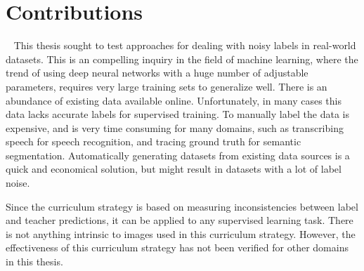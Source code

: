 \section{Contributions}~\label{cont}
\label{sec:Contributions}
This thesis sought to test approaches for dealing with noisy labels in real-world datasets. This is an compelling inquiry in the field of machine learning, where the trend of using deep neural networks with a huge number of adjustable parameters, requires very large training sets to generalize well. There is an abundance of existing data available online. Unfortunately, in many cases this data lacks accurate labels for supervised training. To manually label the data is expensive, and is very time consuming for many domains, such as transcribing speech for speech recognition, and tracing ground truth for semantic segmentation. Automatically generating datasets from existing data sources is a quick and economical solution, but might result in datasets with a lot of label noise.\\


Since the curriculum  strategy is based on measuring inconsistencies between label and teacher predictions, it can be applied to any supervised learning task. There is not anything intrinsic to images used in this curriculum strategy. However, the effectiveness of this curriculum strategy has not been verified for other domains in this thesis.\\
